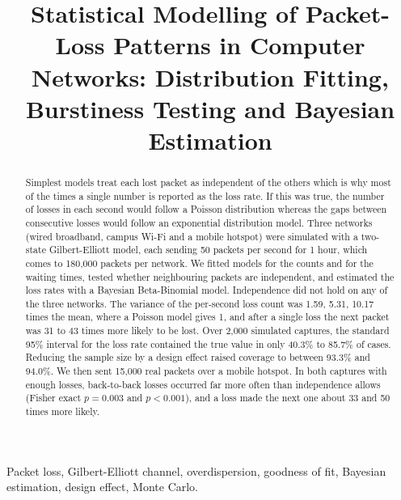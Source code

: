 \documentclass[conference]{IEEEtran}
\begin{document}
\title{Statistical Modelling of Packet-Loss Patterns in Computer Networks: Distribution Fitting, Burstiness Testing and Bayesian Estimation}

\author{
\and
{}
\and
{}
}

\maketitle

\begin{abstract}
Simplest models treat each lost packet as independent of the others which is why most of the times a single number is reported as the loss rate. If this was true, the number of losses in each second would follow a Poisson distribution whereas the gaps between consecutive losses would follow an exponential distribution model. Three networks (wired broadband, campus Wi-Fi and a mobile hotspot) were simulated with a two-state Gilbert-Elliott model, each sending 50 packets per second for 1 hour, which comes to 180{,}000 packets per network. We fitted models for the counts and for the waiting times, tested whether neighbouring packets are independent, and estimated the loss rates with a Bayesian Beta-Binomial model. Independence did not hold on any of the three networks. The variance of the per-second loss count was 1.59, 5.31, 10.17 times the mean, where a Poisson model gives 1, and after a single loss the next packet was 31 to 43 times more likely to be lost. Over 2{,}000 simulated captures, the standard 95\% interval for the loss rate contained the true value in only 40.3\% to 85.7\% of cases. Reducing the sample size by a design effect raised coverage to between 93.3\% and 94.0\%. We then sent 15{,}000 real packets over a mobile hotspot. In both captures with enough losses, back-to-back losses occurred far more often than independence allows (Fisher exact $p=0.003$ and $p<0.001$), and a loss made the next one about 33 and 50 times more likely.
\end{abstract}

\begin{IEEEkeywords}
Packet loss, Gilbert-Elliott channel, overdispersion, goodness of fit, Bayesian estimation, design effect, Monte Carlo.
\end{IEEEkeywords}
\end{document}
